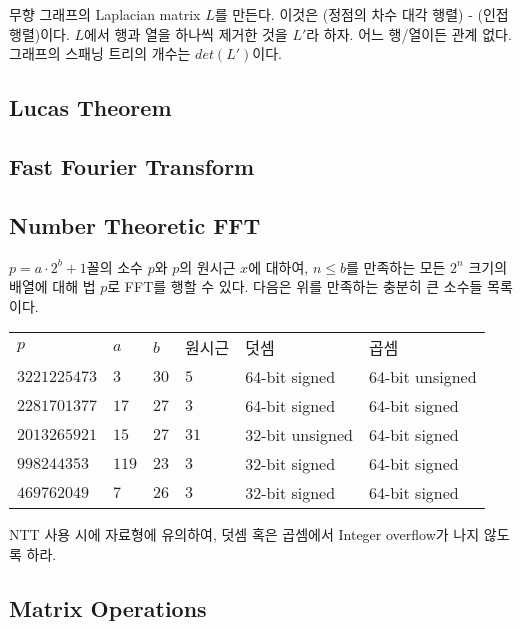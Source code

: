 \documentclass[10pt,landscape,a4paper,twocolumn]{article}
\begin{document}
무향 그래프의 Laplacian matrix $L$를 만든다. 이것은 (정점의 차수 대각 행렬) - (인접행렬)이다.
$L$에서 행과 열을 하나씩 제거한 것을 $L'$라 하자. 어느 행/열이든 관계 없다.
그래프의 스패닝 트리의 개수는 $det(L')$이다.

\subsection{Lucas Theorem}


\subsection{Fast Fourier Transform}


\subsection{Number Theoretic FFT}

$p = a \cdot 2^b + 1$꼴의 소수 $p$와 $p$의 원시근 $x$에 대하여, $n \leq b$를 만족하는
모든 $2^n$ 크기의 배열에 대해 법 $p$로 FFT를 행할 수 있다.
다음은 위를 만족하는 충분히 큰 소수들 목록이다.

\newpage

\begin{table}[]
\begin{tabular}{llllll}
$p$ & $a$ & $b$ & 원시근 & 덧셈 & 곱셈 \\
$3221225473$ & $3$ & $30$ & $5$ & 64-bit signed & 64-bit unsigned \\
$2281701377$ & $17$ & $27$ & $3$ & 64-bit signed & 64-bit signed \\
$2013265921$ & $15$ & $27$ & $31$ & 32-bit unsigned & 64-bit signed \\
$998244353$ & $119$ & $23$ & $3$ & 32-bit signed & 64-bit signed \\
$469762049$ & $7$ & $26$ & $3$ & 32-bit signed & 64-bit signed \\
\end{tabular}
\end{table}

NTT 사용 시에 자료형에 유의하여, 덧셈 혹은 곱셈에서 Integer overflow가 나지 않도록 하라.



\subsection{Matrix Operations}

\end{document}
